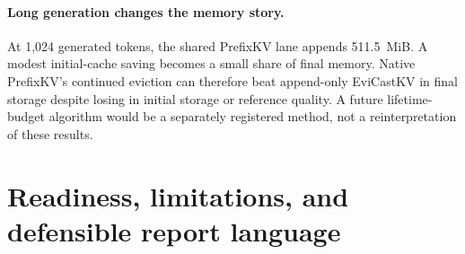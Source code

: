 \documentclass[10pt,letterpaper]{article}
\newcommand{\Evi}{EviCastKV}
\begin{document}
\paragraph{Long generation changes the memory story.}
At 1,024 generated tokens, the shared PrefixKV lane appends 511.5~MiB.
A modest initial-cache saving becomes a small share of final memory.
Native PrefixKV's continued eviction can therefore beat append-only
\Evi{} in final storage despite losing in initial storage or reference
quality. A future lifetime-budget algorithm would be a separately
registered method, not a reinterpretation of these results.

\section{Readiness, limitations, and defensible report language}
\end{document}
